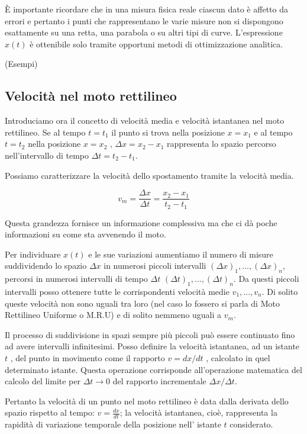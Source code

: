 \documentclass[class=book, crop=false, oneside, 12pt]{standalone}
\begin{document}
È importante ricordare che in una misura fisica reale ciascun dato è
affetto da errori e pertanto i punti che rappresentano le varie misure
non si dispongono esattamente su una retta, una parabola o su altri tipi
di curve. L'espressione \(x(t)\) è ottenibile solo tramite opportuni
metodi di ottimizzazione analitica.

(Esempi)

\subsection{Velocità nel moto rettilineo}
Introduciamo ora il concetto di velocità media e velocità istantanea nel
moto rettilineo. Se al tempo \(t = t_1\) il punto si trova nella posizione \(x = x_1\) e al
tempo \(t = t_2\) nella posizione \(x = x_2\) ,
\(\Delta x = x_2 - x_1\) rappresenta lo spazio percorso nell'intervallo
di tempo \(\Delta t = t_2 - t_1\).

Possiamo caratterizzare la velocità dello spostamento tramite la
velocità media.

\begin{equation}
v_m = \frac {\Delta x} {\Delta t} = \frac {x_2 - x_1} {t_2 - t_1}
\end{equation}

Questa grandezza fornisce un informazione complessiva ma che ci dà poche
informazioni su come sta avvenendo il moto.

Per individuare \(x(t)\) e le sue variazioni aumentiamo il numero di
misure suddividendo lo spazio \(\Delta x\) in numerosi piccoli
intervalli \((\Delta x)_1,...,(\Delta x)_n\), percorsi in numerosi
intervalli di tempo \(\Delta t\) \((\Delta t)_1,...,(\Delta t)_n\). Da
questi piccoli intervalli posso ottenere tutte le corrispondenti
velocità medie \(v_1,...,v_n\). Di solito queste velocità non sono
uguali tra loro (nel caso lo fossero si parla di Moto Rettilineo
Uniforme o M.R.U) e di solito nemmeno uguali a \(v_m\).

Il processo di suddivisione in spazi sempre più piccoli può essere
continuato fino ad avere intervalli infinitesimi. Posso definire la
velocità istantanea, ad un istante \(t\) , del punto in movimento come
il rapporto \(v = dx/dt\) , calcolato in quel determinato istante.
Questa operazione corrisponde all'operazione matematica del calcolo del
limite per \(\Delta t \rightarrow 0\) del rapporto incrementale
\(\Delta x / \Delta t\).

Pertanto la velocità di un punto nel moto rettilineo è data dalla
derivata dello spazio rispetto al tempo: \(v = \frac {dx} {dt}\); la
velocità istantanea, cioè, rappresenta la rapidità di variazione
temporale della posizione nell' istante \(t\) considerato.
\end{document}
